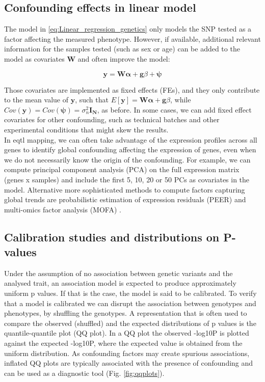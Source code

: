 \subsection{Confounding effects in linear model}

The model in \eqref{eq:Linear_regression_genetics} only models the SNP tested as a factor affecting the measured phenotype.
However, if available, additional relevant information for the samples tested (such as sex or age) can be added to the model as covariates $\mathbf{W}$ and often improve the model:

\begin{equation}\label{eq:Linear_regression_genetics_covariates}
 \mathbf{y} =  \mathbf{W}\boldsymbol{\alpha} + \mathbf{g}\beta + \boldsymbol{\psi} 
\end{equation}

Those covariates are implemented as fixed effects (FEs), and they only contribute to the mean value of $\mathbf{y}$, such that $E[\mathbf{y}] = \mathbf{W}\boldsymbol{\alpha} + \mathbf{g}\beta$, while $Cov(\mathbf{y}) = Cov(\boldsymbol{\psi}) = \sigma_n^2 \mathbf{I_N} $, as before.
In some cases, we can add fixed effect covariates for other confounding, such as technical batches and other experimental conditions that might skew the results. \\

In e\gls{qtl} mapping, we can often take advantage of the expression profiles across all genes to identify global confounding affecting the expression of genes, even when we do not necessarily know the origin of the confounding.
For example, we can compute principal component analysis (PCA) on the full expression matrix (genes x samples) and include the first 5, 10, 20 or 50 PCs as covariates in the model.
Alternative more sophisticated methods to compute factors capturing global trends are probabilistic estimation of expression residuals (PEER) \cite{stegle2010bayesian, stegle2012using} and multi-omics factor analysis (MOFA) \cite{argelaguet2018multi}. 

\subsection{Calibration studies and distributions on P-values}

Under the assumption of no association between genetic variants and the analysed trait, an association model is expected to produce approximately uniform p values.
If that is the case, the model is said to be calibrated.
To verify that a model is calibrated we can disrupt the association between genotypes and phenotypes, by shuffling the genotypes. 
A representation that is often used to compare the observed (shuffled) and the expected distributions of p values is the quantile-quantile plot (QQ plot). 
In a QQ plot the observed -log10P is plotted against the expected -log10P, where the expected value is obtained from the uniform distribution. 
As confounding factors may create spurious associations, inflated QQ plots are typically associated with the presence of confounding and can be used as a diagnostic tool (Fig. \ref{fig:qqplots}). 

